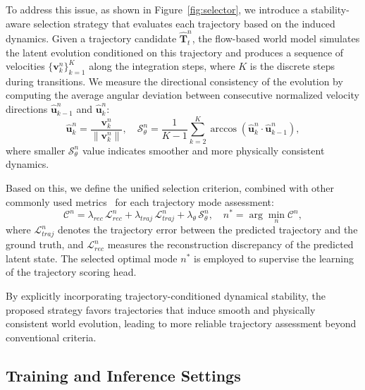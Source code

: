 To address this issue, as shown in Figure~\ref{fig:selector}, we introduce a stability-aware selection strategy that evaluates each trajectory based on the induced dynamics.
Given a trajectory candidate $\hat{\mathbf{T}}_t^{n}$, the flow-based world model simulates the latent evolution conditioned on this trajectory and produces a sequence of velocities 
$\{\mathbf{v}_k^{n}\}_{k=1}^{K}$ along the integration steps, where $K$ is the discrete steps during transitions. 
We measure the directional consistency of the evolution by computing the average angular deviation between consecutive normalized velocity directions $\hat{\mathbf{u}}_{k-1}^{n}$ and $\hat{\mathbf{u}}_{k}^{n}$:
\begin{equation}
\hat{\mathbf{u}}_k^{n} = \frac{\mathbf{v}_k^{n}}{\|\mathbf{v}_k^{n}\|}, \quad
\mathcal{S}_{\theta}^{n} = \frac{1}{K-1}\sum_{k=2}^{K}\arccos\!\left(\hat{\mathbf{u}}_k^{n} \cdot \hat{\mathbf{u}}_{k-1}^{n}\right),
\end{equation}
where smaller $\mathcal{S}_{\theta}^{n}$ value indicates smoother and more physically consistent dynamics.

Based on this, we define the unified selection criterion, combined with other commonly used metrics~\cite {zheng2025world4drive} for each trajectory mode assessment:
\begin{equation}
\mathcal{C}^{n} = 
\lambda_{rec} \, \mathcal{L}_{rec}^{n} 
+ \lambda_{traj} \, \mathcal{L}_{traj}^{n} 
+ \lambda_{\theta} \, \mathcal{S}_{\theta}^{n}, 
\quad
n^* = \arg\min_n \mathcal{C}^{n},
\end{equation}
where $\mathcal{L}_{traj}^{n}$ denotes the trajectory error between the predicted trajectory and the ground truth, and $\mathcal{L}_{rec}^{n}$ measures the reconstruction discrepancy of the predicted latent state.
The selected optimal mode $n^*$ is employed to supervise the learning of the trajectory scoring head.

By explicitly incorporating trajectory-conditioned dynamical stability, the proposed strategy favors trajectories that induce smooth and physically consistent world evolution, leading to more reliable trajectory assessment beyond conventional criteria.

\subsection{Training and Inference Settings}

